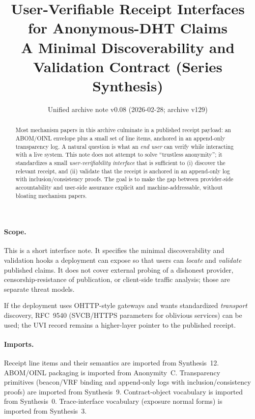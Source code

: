\documentclass[11pt]{article}
\title{User-Verifiable Receipt Interfaces for Anonymous-DHT Claims\\
\large A Minimal Discoverability and Validation Contract (Series Synthesis)}
\author{}
\date{Unified archive note v0.08 (2026-02-28; archive v129)}
\begin{document}
\maketitle

\begin{abstract}
Most mechanism papers in this archive culminate in a published receipt payload: an ABOM/OINL envelope plus a small set of line items, anchored in an append-only transparency log.\cite{series:abomoinl,series:receiptitems,series:transparencyprimitives}
A natural question is what an \emph{end user} can verify while interacting with a live system.
This note does not attempt to solve ``trustless anonymity''; it standardizes a small \emph{user-verifiability interface} that is sufficient to (i) discover the relevant receipt, and (ii) validate that the receipt is anchored in an append-only log with inclusion/consistency proofs.
The goal is to make the gap between provider-side accountability and user-side assurance explicit and machine-addressable, without bloating mechanism papers.
\end{abstract}

\paragraph{Scope.}
This is a short interface note.
It specifies the minimal discoverability and validation hooks a deployment can expose so that users can \emph{locate} and \emph{validate} published claims.
It does not cover external probing of a dishonest provider, censorship-resistance of publication, or client-side traffic analysis; those are separate threat models.

If the deployment uses OHTTP-style gateways and wants standardized \emph{transport} discovery, RFC~9540 (SVCB/HTTPS parameters for oblivious services) can be used; the UVI record remains a higher-layer pointer to the published receipt.\cite{rfc9540OHTTPDiscovery}

\paragraph{Imports.}
Receipt line items and their semantics are imported from Synthesis~12.\cite{series:receiptitems}
ABOM/OINL packaging is imported from Anonymity~C.\cite{series:abomoinl}
Transparency primitives (beacon/VRF binding and append-only logs with inclusion/consistency proofs) are imported from Synthesis~9.\cite{series:transparencyprimitives}
Contract-object vocabulary is imported from Synthesis~0.\cite{series:contractobjects}
Trace-interface vocabulary (exposure normal forms) is imported from Synthesis~3.\cite{series:traceifaces}
\end{document}
